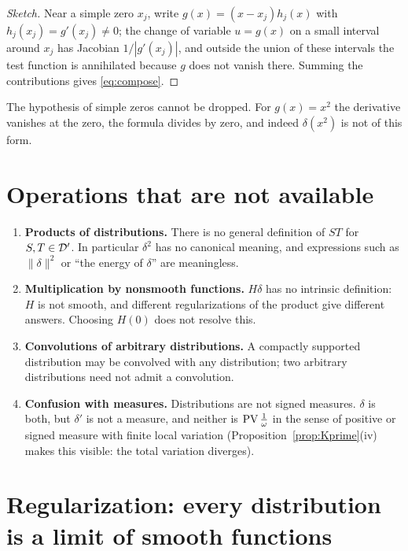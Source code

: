 \begin{proof}[Sketch]
Near a simple zero $x_{j}$, write $g(x)=(x-x_{j})h_{j}(x)$ with $h_{j}(x_{j})=g'(x_{j})\neq0$; the
change of variable $u=g(x)$ on a small interval around $x_{j}$ has Jacobian
$1/|g'(x_{j})|$, and outside the union of these intervals the test function is annihilated because
$g$ does not vanish there. Summing the contributions gives \eqref{eq:compose}.
\end{proof}

\begin{remark}
The hypothesis of simple zeros cannot be dropped. For $g(x)=x^{2}$ the derivative vanishes at the
zero, the formula divides by zero, and indeed $\delta(x^{2})$ is not of this form.
\end{remark}

\section{Operations that are not available}

\begin{enumerate}
\item \textbf{Products of distributions.} There is no general definition of $ST$ for
$S,T\in\mathcal{D}'$. In particular $\delta^{2}$ has no canonical meaning, and expressions such as
$\|\delta\|^{2}$ or ``the energy of $\delta$'' are meaningless.
\item \textbf{Multiplication by nonsmooth functions.} $H\delta$ has no intrinsic definition: $H$ is
not smooth, and different regularizations of the product give different answers. Choosing $H(0)$
does not resolve this.
\item \textbf{Convolutions of arbitrary distributions.} A compactly supported distribution may be
convolved with any distribution; two arbitrary distributions need not admit a convolution.
\item \textbf{Confusion with measures.} Distributions are not signed measures. $\delta$ is both, but
$\delta'$ is not a measure, and neither is $\operatorname{PV}\frac{1}{\omega}$ in the sense of positive or signed
measure with finite local variation (Proposition~\ref{prop:Kprime}(iv) makes this visible: the
total variation diverges).
\end{enumerate}

\section{Regularization: every distribution is a limit of smooth functions}

